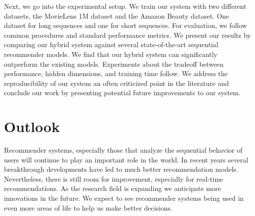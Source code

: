 Next, we go into the experimental setup. We train our system with two different datasets, the MovieLens 1M dataset and the Amazon Beauty dataset. One dataset for long sequences and one for short sequences. For evaluation, we follow common procedures and standard performance metrics. We present our results by comparing our hybrid system against several state-of-the-art sequential recommender models. We find that our hybrid system can significantly outperform the existing models. Experiments about the tradeoff between performance, hidden dimensions, and training time follow. We address the reproducibility of our system an often criticized point in the literature and conclude our work by presenting potential future improvements to our system.


\section{Outlook}
Recommender systems, especially those that analyze the sequential behavior of users will continue to play an important role in the world. In recent years several breakthrough developments have led to much better recommendation models. Nevertheless, there is still room for improvement, especially for real-time recommendations. As the research field is expanding we anticipate more innovations in the future. We expect to see recommender systems being used in even more areas of life to help us make better decisions.